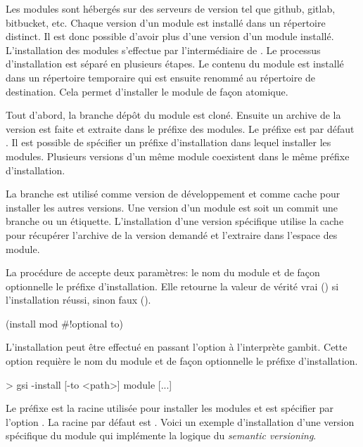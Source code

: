 


Les modules sont hébergés sur des serveurs de version tel que github, gitlab,
bitbucket, etc. Chaque version d'un module est installé dans un répertoire
distinct. Il est donc possible d'avoir plus d'une version d'un module installé.
L'installation des modules s'effectue par l'intermédiaire de
. Le processus d'installation est séparé en plusieurs étapes.  Le
contenu du module est installé dans un répertoire temporaire qui est ensuite
renommé au répertoire de destination. Cela permet d'installer le module de
façon atomique.

Tout d'abord, la
branche  dépôt du module est cloné. Ensuite un archive de la
version est faite et extraite dans le préfixe des modules. Le préfixe est par
défaut .  Il est possible de spécifier un préfixe
d'installation dans lequel installer les modules. Plusieurs versions d'un même
module coexistent dans le même préfixe d'installation.

La branche  est utilisé comme version de développement et
comme cache pour installer les autres versions. Une version d'un module est soit
un commit une branche ou un étiquette. L'installation d'une version
spécifique utilise la cache pour récupérer l'archive de la version demandé
et l'extraire dans l'espace des module.

La procédure  de  accepte deux paramètres:
le nom du module et de façon optionnelle le préfixe d'installation. Elle
retourne la valeur de vérité vrai () si l'installation réussi,
sinon faux ().
\begin{center}
  \begin{mplisting}{0.4}
(install mod #!optional to)
\end{mplisting}
\end{center}

L'installation peut être effectué en passant l'option 
à l'interprète gambit. Cette option requière le nom du module et
de façon optionnelle le préfixe d'installation.
\begin{center}
  \begin{mplisting}{0.8}
> gsi -install [-to <path>] module [...]
\end{mplisting}
\end{center}
Le préfixe  est la racine utilisée pour installer les modules
et est spécifier par l'option .  La racine par défaut est
. Voici un exemple d'installation d'une version spécifique du module
 qui implémente la logique du \textit{semantic versioning}.

